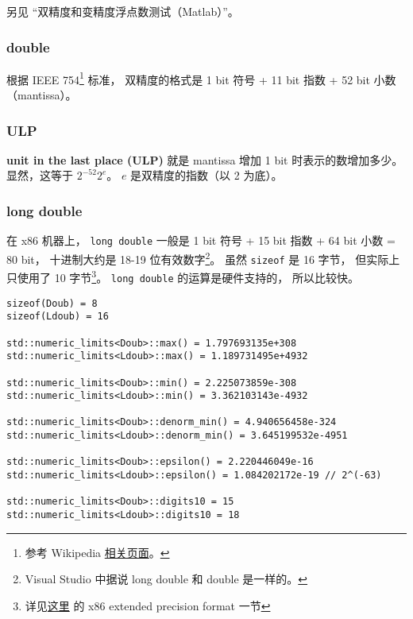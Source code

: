 
\begin{issues}
\issueDraft
\end{issues}

另见 “双精度和变精度浮点数测试（Matlab）”。

\subsubsection{double}
根据 IEEE 754\footnote{参考 Wikipedia \href{https://en.wikipedia.org/wiki/IEEE_754}{相关页面}。} 标准， 双精度的格式是 1 bit 符号 + 11 bit 指数 + 52 bit 小数（mantissa）。

\subsubsection{ULP}
\textbf{unit in the last place (ULP)} 就是 mantissa 增加 1 bit 时表示的数增加多少。 显然，这等于 $2^{-52}2^{e}$。 $e$ 是双精度的指数（以 2 为底）。

\subsubsection{long double}
在 x86 机器上， \verb|long double| 一般是 1 bit 符号 + 15 bit 指数 + 64 bit 小数 = 80 bit， 十进制大约是 18-19 位有效数字\footnote{Visual Studio 中据说 long double 和 double 是一样的。}。 虽然 \verb|sizeof| 是 16 字节， 但实际上只使用了 10 字节\footnote{详见\href{https://en.wikipedia.org/wiki/Extended_precision}{这里} 的 x86 extended precision format 一节}。 \verb|long double| 的运算是硬件支持的， 所以比较快。

\begin{lstlisting}[language=none]
sizeof(Doub) = 8
sizeof(Ldoub) = 16

std::numeric_limits<Doub>::max() = 1.797693135e+308
std::numeric_limits<Ldoub>::max() = 1.189731495e+4932

std::numeric_limits<Doub>::min() = 2.225073859e-308
std::numeric_limits<Ldoub>::min() = 3.362103143e-4932

std::numeric_limits<Doub>::denorm_min() = 4.940656458e-324
std::numeric_limits<Ldoub>::denorm_min() = 3.645199532e-4951

std::numeric_limits<Doub>::epsilon() = 2.220446049e-16
std::numeric_limits<Ldoub>::epsilon() = 1.084202172e-19 // 2^(-63)

std::numeric_limits<Doub>::digits10 = 15
std::numeric_limits<Ldoub>::digits10 = 18
\end{lstlisting}

